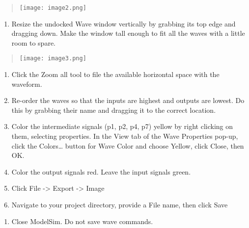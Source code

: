 \begin{quote}
\texttt{[image: image2.png]}
\end{quote}

\begin{enumerate}
\def\labelenumi{\alph{enumi}.}
\setcounter{enumi}{1}
\item
  Resize the undocked Wave window vertically by grabbing its top edge
  and dragging down. Make the window tall enough to fit all the waves
  with a little room to spare.
\end{enumerate}

\begin{quote}
\texttt{[image: image3.png]}
\end{quote}

\begin{enumerate}
\def\labelenumi{\alph{enumi}.}
\setcounter{enumi}{2}
\item
  Click the Zoom all tool to file the available horizontal space with
  the waveform.
\item
  Re-order the waves so that the inputs are highest and outputs are
  lowest. Do this by grabbing their name and dragging it to the correct
  location.
\item
  Color the intermediate signals (p1, p2, p4, p7) yellow by right
  clicking on them, selecting properties. In the View tab of the Wave
  Properties pop-up, click the Colors\ldots{} button for Wave Color and
  choose Yellow, click Close, then OK.
\item
  Color the output signals red. Leave the input signals green.
\item
  Click File -\textgreater{} Export -\textgreater{} Image
\item
  Navigate to your project directory, provide a File name, then click
  Save
\end{enumerate}

\begin{enumerate}
\def\labelenumi{\arabic{enumi}.}
\setcounter{enumi}{11}
\item
  Close ModelSim. Do not save wave commands.
\end{enumerate}

